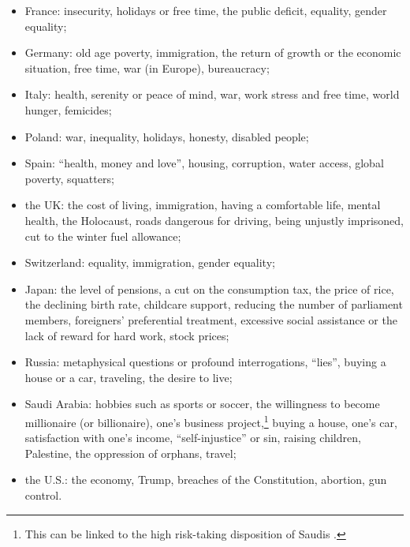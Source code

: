 \begin{itemize}
  \item France: insecurity, holidays or free time, the public deficit, equality, gender equality;
  \item Germany: old age poverty, immigration, the return of growth or the economic situation, free time, war (in Europe), bureaucracy;
  \item Italy: health, serenity or peace of mind, war, work stress and free time, world hunger, femicides; 
  \item Poland: war, inequality, holidays, honesty, disabled people;
  \item Spain: ``health, money and love'', housing, corruption, water access, global poverty, squatters;
  \item the UK: the cost of living, immigration, having a comfortable life, mental health, the Holocaust, roads dangerous for driving, being unjustly imprisoned, cut to the winter fuel allowance;
  \item Switzerland: equality, immigration, gender equality;
  \item Japan: the level of pensions, a cut on the consumption tax, the price of rice, the declining birth rate, childcare support, reducing the number of parliament members, foreigners' preferential treatment, excessive social assistance or the lack of reward for hard work, stock prices;
  \item Russia: metaphysical questions or profound interrogations, ``lies'', buying a house or a car, traveling, the desire to live;
  \item Saudi Arabia: hobbies such as sports or soccer, the willingness to become millionaire (or billionaire), one's business project,\footnote{This can be linked to the high risk-taking disposition of Saudis \citep{falk_global_2018}.} buying a house, one's car, satisfaction with one's income, ``self-injustice'' or sin, raising children, Palestine, the oppression of orphans, travel;
  \item the U.S.: the economy, Trump, breaches of the Constitution, abortion, gun control.
\end{itemize}

\renewcommand{\theenumi}{\arabic{enumi}}
\clearpage
